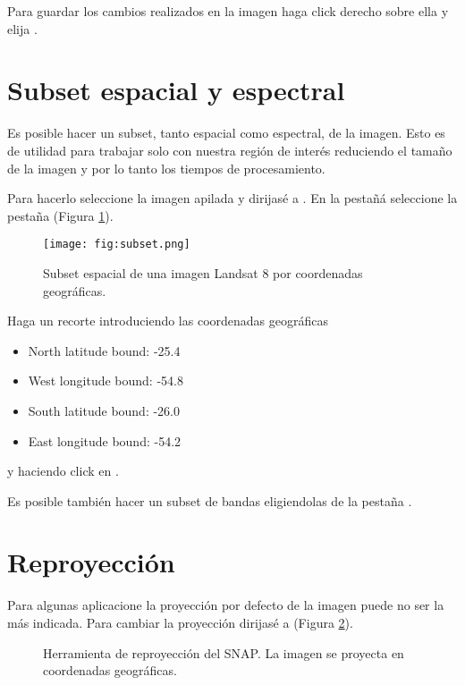 Para guardar los cambios realizados en la imagen haga click derecho sobre ella y elija .

\section{Subset espacial y espectral}
Es posible hacer un subset, tanto espacial como espectral, de la imagen. Esto es de utilidad para trabajar solo con nuestra región de interés reduciendo el tamaño de la imagen y por lo tanto los tiempos de procesamiento.

Para hacerlo seleccione la imagen apilada y dirijasé a . En la pestañá  seleccione la pestaña  (Figura \ref{fig:subset}).

\begin{figure}[h!]
    \centering
    \texttt{[image: fig:subset.png]}
    \caption{Subset espacial de una imagen Landsat 8 por coordenadas geográficas.}
    \label{fig:subset}
\end{figure}

Haga un recorte introduciendo las coordenadas geográficas

\begin{itemize}
    \item North latitude bound: -25.4
    \item West longitude bound: -54.8
    \item South latitude bound: -26.0
    \item East longitude bound: -54.2
\end{itemize}

y haciendo click en .

Es posible también hacer un subset de bandas eligiendolas de la pestaña .

\section{Reproyección}
Para algunas aplicacione la proyección por defecto de la imagen puede no ser la más indicada. Para cambiar la proyección dirijasé a  (Figura \ref{fig:repro}).

\begin{figure}[h!]
    \centering
    \hspace{1cm}
    \caption{Herramienta de reproyección del SNAP. La imagen se proyecta en coordenadas geográficas.}
    \label{fig:repro}
\end{figure}

